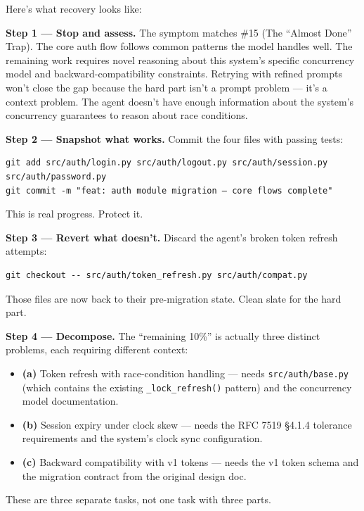 \documentclass[
  a4paper,
  DIV=11,
  numbers=noendperiod]{scrreprt}
\providecommand{\tightlist}{%
  \setlength{\itemsep}{0pt}\setlength{\parskip}{0pt}}
\begin{document}
Here's what recovery looks like:

\textbf{Step 1 --- Stop and assess.} The symptom matches \#15 (The
``Almost Done'' Trap). The core auth flow follows common patterns the
model handles well. The remaining work requires novel reasoning about
this system's specific concurrency model and backward-compatibility
constraints. Retrying with refined prompts won't close the gap because
the hard part isn't a prompt problem --- it's a context problem. The
agent doesn't have enough information about the system's concurrency
guarantees to reason about race conditions.

\textbf{Step 2 --- Snapshot what works.} Commit the four files with
passing tests:

\begin{verbatim}
git add src/auth/login.py src/auth/logout.py src/auth/session.py src/auth/password.py
git commit -m "feat: auth module migration — core flows complete"
\end{verbatim}

This is real progress. Protect it.

\textbf{Step 3 --- Revert what doesn't.} Discard the agent's broken
token refresh attempts:

\begin{verbatim}
git checkout -- src/auth/token_refresh.py src/auth/compat.py
\end{verbatim}

Those files are now back to their pre-migration state. Clean slate for
the hard part.

\textbf{Step 4 --- Decompose.} The ``remaining 10\%'' is actually three
distinct problems, each requiring different context:

\begin{itemize}
\tightlist
\item
  \textbf{(a)} Token refresh with race-condition handling --- needs
  \texttt{src/auth/base.py} (which contains the existing
  \texttt{\_lock\_refresh()} pattern) and the concurrency model
  documentation.
\item
  \textbf{(b)} Session expiry under clock skew --- needs the RFC 7519
  §4.1.4 tolerance requirements and the system's clock sync
  configuration.
\item
  \textbf{(c)} Backward compatibility with v1 tokens --- needs the v1
  token schema and the migration contract from the original design doc.
\end{itemize}

These are three separate tasks, not one task with three parts.
\end{document}
